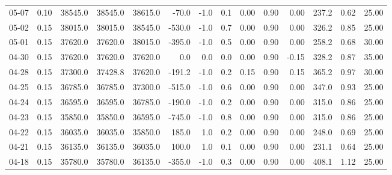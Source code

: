 \begin{threeparttable}
{\begin{tabular}{lrrrrrrrrrrrrr}
  05-07 &     0.10 & 38545.0 & 38545.0 & 38615.0 &      -70.0 &                     -1.0 &                 0.1 &       0.00 &      0.90 &           0.00 &            237.2 &            0.62 &                  25.00 \\
  05-02 &     0.15 & 38015.0 & 38015.0 & 38545.0 &     -530.0 &                     -1.0 &                 0.7 &       0.00 &      0.90 &           0.00 &            326.2 &            0.85 &                  25.00 \\
  05-01 &     0.15 & 37620.0 & 37620.0 & 38015.0 &     -395.0 &                     -1.0 &                 0.5 &       0.00 &      0.90 &           0.00 &            258.2 &            0.68 &                  30.00 \\
  04-30 &     0.15 & 37620.0 & 37620.0 & 37620.0 &        0.0 &                      0.0 &                 0.0 &       0.00 &      0.90 &          -0.15 &            328.2 &            0.87 &                  35.00 \\
  04-28 &     0.15 & 37300.0 & 37428.8 & 37620.0 &     -191.2 &                     -1.0 &                 0.2 &       0.15 &      0.90 &           0.15 &            365.2 &            0.97 &                  30.00 \\
  04-25 &     0.15 & 36785.0 & 36785.0 & 37300.0 &     -515.0 &                     -1.0 &                 0.6 &       0.00 &      0.90 &           0.00 &            347.0 &            0.93 &                  25.00 \\
  04-24 &     0.15 & 36595.0 & 36595.0 & 36785.0 &     -190.0 &                     -1.0 &                 0.2 &       0.00 &      0.90 &           0.00 &            315.0 &            0.86 &                  25.00 \\
  04-23 &     0.15 & 35850.0 & 35850.0 & 36595.0 &     -745.0 &                     -1.0 &                 0.8 &       0.00 &      0.90 &           0.00 &            315.0 &            0.86 &                  25.00 \\
  04-22 &     0.15 & 36035.0 & 36035.0 & 35850.0 &      185.0 &                      1.0 &                 0.2 &       0.00 &      0.90 &           0.00 &            248.0 &            0.69 &                  25.00 \\
  04-21 &     0.15 & 36135.0 & 36135.0 & 36035.0 &      100.0 &                      1.0 &                 0.1 &       0.00 &      0.90 &           0.00 &            231.1 &            0.64 &                  25.00 \\
  04-18 &     0.15 & 35780.0 & 35780.0 & 36135.0 &     -355.0 &                     -1.0 &                 0.3 &       0.00 &      0.90 &           0.00 &            408.1 &            1.12 &                  25.00 \\

\end{tabular}}
\end{threeparttable}
